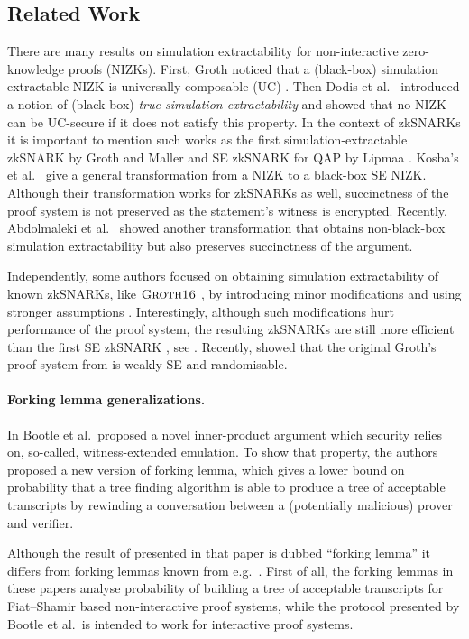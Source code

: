 \documentclass[runningheads,11pt]{llncs}
\theoremstyle{definition} \newtheorem{definition}[theorem]{Definition}
\begin{document}
\subsection{Related Work}
There are many results on simulation extractability for non-interactive
zero-knowledge proofs (NIZKs). First, Groth \cite{AC:Groth07} noticed that a
(black-box) simulation extractable NIZK is universally-composable (UC)
\cite{EPRINT:Canetti00}. Then Dodis et al.~\cite{AC:DHLW10} introduced a notion
of (black-box) \emph{true simulation extractability} and showed that no NIZK can
be UC-secure if it does not satisfy this property. In the context of zkSNARKs it is
important to mention such works as the first simulation-extractable zkSNARK by
Groth and Maller \cite{C:GroMal17} and SE zkSNARK for QAP by Lipmaa
\cite{EPRINT:Lipmaa19a}. Kosba's et al.~\cite{EPRINT:KZMQCP15} give a general
transformation from a NIZK to a black-box SE NIZK. Although their transformation
works for zkSNARKs as well, succinctness of the proof system is not preserved as
the statement's witness is encrypted. Recently, Abdolmaleki et
al.~\cite{CCS:AbdRamSla20} showed another transformation that obtains
non-black-box simulation extractability but also preserves succinctness of the
argument.

Independently, some authors focused on obtaining simulation extractability of
known zkSNARKs, like $\textsc{Groth16}$ \cite{EC:Groth16}, by introducing minor
modifications and using stronger assumptions
\cite{EPRINT:BowGab18,EPRINT:AtaBag19}. Interestingly, although such
modifications hurt performance of the proof system, the resulting zkSNARKs are
still more efficient than the first SE zkSNARK \cite{C:GroMal17}, see
\cite{EPRINT:AtaBag19}. Recently, \cite{EPRINT:BKSV20} showed that the original
Groth's proof system from \cite{EC:Groth16} is weakly SE and randomisable.

\paragraph{Forking lemma generalizations.}
In \cite{EC:BCCGP16} Bootle et al.~proposed a novel inner-product argument which
security relies on, so-called, witness-extended emulation. To show that
property, the authors proposed a new version of forking lemma, which gives a
lower bound on probability that a tree finding algorithm is able to produce a 
tree of acceptable transcripts by rewinding a conversation between a
(potentially malicious) prover and verifier.

Although the result of presented in that paper is dubbed ``forking lemma'' it
differs from forking lemmas known from e.g.~\cite{JC:PoiSte00,CCS:BelNev06}.
First of all, the forking lemmas in these papers analyse probability of building
a tree of acceptable transcripts for Fiat--Shamir based non-interactive proof
systems, while the protocol presented by Bootle et al.~is intended to work for
interactive proof systems.
\end{document}
